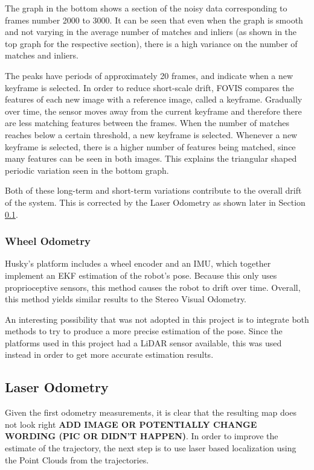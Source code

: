 \documentclass[11pt]{article}
\begin{document}
The graph in the bottom shows a section of the noisy data corresponding to frames number 2000 to 3000. It can be seen that even when the graph is smooth and not varying in the average number of matches and inliers (as shown in the top graph for the respective section), there is a high variance on the number of matches and inliers. 

The peaks have periods of approximately 20 frames, and indicate when a new keyframe is selected. In order to reduce short-scale drift, FOVIS compares the features of each new image with a reference image, called a keyframe. Gradually over time, the sensor moves away from the current keyframe and therefore there are less matching features between the frames. When the number of matches reaches below a certain threshold, a new keyframe is selected. Whenever a new keyframe is selected, there is a higher number of features being matched, since many features can be seen in both images. This explains the triangular shaped periodic variation seen in the bottom graph.

Both of these long-term and short-term variations contribute to the overall drift of the system. This is corrected by the Laser Odometry as shown later in Section \ref{subs:LaserOd}.	
	
	\subsubsection*{Wheel Odometry}

Husky's platform includes a wheel encoder and an IMU, which together implement an EKF estimation of the robot's pose. Because this only uses proprioceptive sensors, this method causes the robot to drift over time. Overall, this method yields similar results to the Stereo Visual Odometry.

An interesting possibility that was not adopted in this project is to integrate both methods to try to produce a more precise estimation of the pose. Since the platforms used in this project had a LiDAR sensor available, this was used instead in order to get more accurate estimation results.

	\subsection{Laser Odometry}
	\label{subs:LaserOd}
Given the first odometry measurements, it is clear that the resulting map does not look right \textbf{ADD IMAGE OR POTENTIALLY CHANGE WORDING (PIC OR DIDN'T HAPPEN)}. In order to improve the estimate of the trajectory, the next step is to use laser based localization using the Point Clouds from the trajectories.
	
\end{document}
